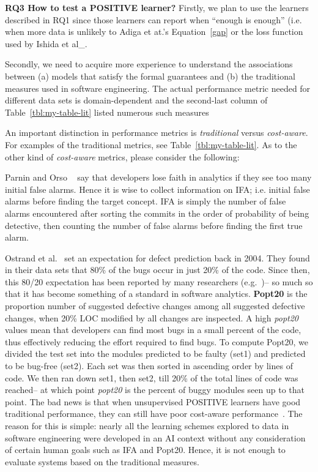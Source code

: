   
  \textbf{}
  
  
\noindent 
{\bf RQ3 How to test   a POSITIVE learner?}
Firstly, we plan to  use the learners described in RQ1 since those learners
can report when ``enough is enough'' (i.e. when more data is unlikely to   Adiga  et at.'s Equation~\ref{gap} or the loss function used by Ishida  et  al_.

Secondly, we need to acquire more experience to understand the associations between (a) models that satisfy the formal guarantees and (b) the traditional measures used in software engineering.
The actual performance metric needed for different data sets is domain-dependent and 
the second-last column of Table~\ref{tbl:my-table-lit} listed numerous such measures

An important distinction in performance metrics is {\em traditional} versus {\em cost-aware}.
For examples of the traditional metrics, see Table~\ref{tbl:my-table-lit}.
As to the other kind of  
{\em cost-aware} metrics, please consider the following:
\bi
\item
  Parnin and Orso ~\cite{parnin2011automated}  say that developers lose faith in analytics if they see too many initial false alarms.  Hence it is wise to collect information on IFA;
  i.e.
  initial false alarms before finding the target concept.
  IFA is simply the number of false alarms encountered after sorting the commits in the order of probability of being detective, then counting the number of false alarms before finding the first true alarm.
\item
Ostrand et al.~\cite{ostrand04} set an expectation for defect prediction back in 2004. They found in their data sets
that 80\% of the bugs occur in just 20\% of the code. Since then, this 80/20 expectation has been reported
by many researchers (e.g.~\cite{hamill2009common})-- so much so that it has become something 
of a standard in software analytics.
\textbf{Popt20} is the proportion number of suggested defective changes among all suggested defective changes, when 20\% LOC modified by all changes are inspected. A high {\em popt20} values mean that developers can find most bugs in a small percent of the code, thus effectively reducing the effort required to find bugs. To compute Popt20, we divided the test set into the modules predicted to be faulty (set1) and predicted to be bug-free (set2). Each set was then sorted in ascending order by lines of code.  We then ran down set1, then set2, till 20\% of the total lines of code was reached-- at which point {\em popt20} is the percent of buggy modules seen up to that point.
\ei
The bad news is that   when unsupervised POSITIVE learners have good traditional performance, they can still
have poor cost-aware performance~\cite{9115238}. The reason for this is simple: nearly all the learning schemes
explored to data in software engineering were developed in an AI context without any consideration of  certain human goals such as IFA and Popt20. Hence, it is not enough to evaluate systems based on the traditional measures. 

